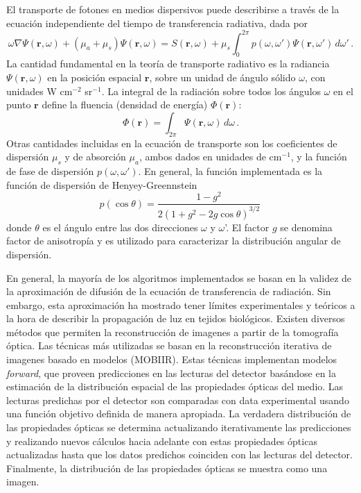 \documentclass[a4paper,10pt]{article}
\begin{document}
El transporte de fotones en medios dispersivos puede describirse a 
través de la ecuación independiente del tiempo de transferencia 
radiativa, dada por
\begin{equation}
 \omega\nabla\Psi(\mathbf{r},\omega)+(\mu_a+\mu_s)\Psi(\mathbf{r},\omega)
 =S(\mathbf{r},\omega) + 
 \mu_s\int_0^{2\pi}p(\omega,\omega')\Psi(\mathbf{r},\omega')\,d\omega'\,.
\label{eq:transf-rad}
\end{equation}
La cantidad fundamental en la teoría de transporte radiativo es la
radiancia $\Psi(\mathbf{r},\omega)$ en la posición espacial 
$\mathbf{r}$, sobre un unidad de ángulo sólido $\omega$, con unidades 
W cm$^{-2}$ sr$^{-1}$. La integral de la radiación sobre todos los 
ángulos $\omega$ en el punto $\mathbf{r}$ define la fluencia (densidad de 
energía) $\Phi(\mathbf{r})$:
\begin{equation}
 \Phi(\mathbf{r})=\int_{2\pi}\Psi(\mathbf{r},\omega)\,d\omega\,.
\end{equation}
Otras cantidades incluidas en la ecuación de transporte son los 
coeficientes de dispersión $\mu_s$ y de absorción $\mu_a$, ambos dados 
en unidades de cm$^{-1}$, y la función de fase de dispersión 
$p(\omega,\omega')$. En general, la función implementada es la función de
 dispersión de Henyey-Greennstein
\begin{equation}
 p(\cos\theta)=\frac{1-g^2}{2(1+g^2-2g\cos\theta)^{3/2}}\,
\end{equation}
donde $\theta$ es el ángulo entre las dos direcciones $\omega$ y 
$\omega$'. El factor $g$ se denomina factor de anisotropía y es utilizado 
para caracterizar la distribución angular de dispersión.

En general, la mayoría de los algoritmos implementados se basan en la validez 
de la aproximación de difusión de la ecuación de transferencia de radiación.
Sin embargo, esta aproximación ha mostrado tener límites experimentales y 
teóricos a la hora de describir la propagación de luz en tejidos biológicos.
Existen diversos métodos que permiten la reconstrucción de imagenes a partir 
de la tomografía óptica. Las técnicas más utilizadas se basan 
en la reconstrucción iterativa de imagenes basado en modelos (MOBIIR).
Estas técnicas implementan modelos {\it forward}, que proveen predicciones
en las lecturas del detector basándose en la estimación de la distribución
espacial de las propiedades ópticas del medio. Las lecturas predichas por 
el detector son comparadas con data experimental usando una función objetivo 
definida de manera apropiada. La verdadera distribución de las propiedades 
ópticas se determina actualizando iterativamente las predicciones y 
realizando nuevos cálculos hacia adelante con estas propiedades ópticas 
actualizadas hasta que los datos predichos coinciden con las lecturas del 
detector. Finalmente, la distribución de las propiedades ópticas se muestra 
como una imagen. 
\end{document}
